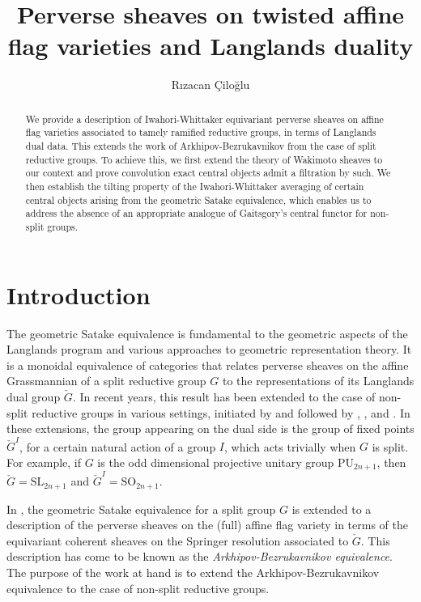 \documentclass{amsart}
\title[Twisted affine flag varieties and Langlands duality]{Perverse sheaves on twisted affine flag varieties and Langlands duality}
\author{R{\i}zacan \c{C}ilo\u{g}lu}
\numberwithin{equation}{section}
\theoremstyle{definition}
\theoremstyle{remark}
\begin{document}
\begin{abstract}
	We provide a description of Iwahori-Whittaker equivariant perverse sheaves on affine
	flag varieties associated to tamely ramified reductive groups, in terms of Langlands dual data. This
	extends the work of Arkhipov-Bezrukavnikov \cite{arkhipovBezrukavnikov} from the case of
	split reductive groups.
	To achieve this, we first extend the theory of Wakimoto
	sheaves to our context and prove convolution exact central objects admit a filtration by
	such. We then establish the tilting property of the Iwahori-Whittaker averaging of certain central objects arising from the geometric Satake equivalence, which enables us
        to address the absence of an appropriate analogue of Gaitsgory's central functor \cite{gaitsgoryCentral} for non-split groups.
\end{abstract}
\maketitle
\setcounter{tocdepth}{1}
\tableofcontents
\section{Introduction}
The geometric Satake equivalence \cite{mirkovicvilonenSatake} is fundamental to the geometric aspects of the Langlands program and various approaches to
geometric representation theory. It is a monoidal
equivalence of categories that relates perverse sheaves on the affine Grassmannian of a split
reductive group $G$ to the representations
of its Langlands dual group $\check G$. In recent years, this result has been extended to the case of non-split reductive groups in various settings, initiated by
\cite{zhuRamified} and followed by \cite{richarzRamified}, \cite{modularRamified}, and
\cite{thibaudSatake}. In these extensions, the group appearing on
the dual side is the group of fixed points $\check G^I$, for a certain natural action of
a group $I$, which acts trivially when $G$ is split. For example, if $G$ is the odd dimensional
projective unitary
group $\mathrm{PU}_{2n+1}$, then $\check G=\mathrm{SL}_{2n+1}$ and $\check G^I=\mathrm{SO}_{2n+1}$.

In \cite{arkhipovBezrukavnikov}, the geometric Satake equivalence
for a split group $G$ is extended to a description of the perverse sheaves on the (full) affine flag
variety in terms of the equivariant coherent sheaves on the Springer resolution associated to $\check G$. This
description has come to be known as the \textit{Arkhipov-Bezrukavnikov equivalence}.
The purpose of the work at hand is to extend the Arkhipov-Bezrukavnikov equivalence
to the case of non-split reductive groups.
\end{document}
